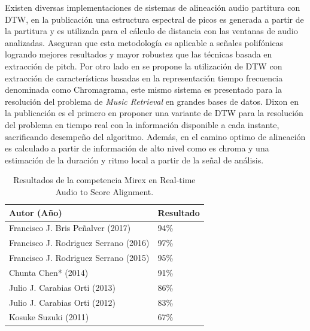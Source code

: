 \documentclass
  [ams,pdfout]%
	{aeslac}
\begin{document}
Existen diversas implementaciones de sistemas de alineación audio partitura con DTW, en la publicación \cite{orio2001alignment} una estructura espectral de picos es generada a partir de la partitura y es utilizada para el cálculo de distancia con las ventanas de audio analizadas. Aseguran que esta metodología es aplicable a señales polifónicas logrando mejores resultados y mayor robustez que las técnicas basada en extracción de pitch. Por otro lado en \cite{dannenberg2006music} se propone la utilización de DTW con extracción de características basadas en la representación tiempo frecuencia denominada como Chromagrama, este mismo sistema es presentado para la resolución del problema de \textit{Music Retrieval} en grandes bases de datos. Dixon en la publicación \cite{dixon2005live} es el primero en proponer una variante de DTW para la resolución del problema en tiempo real con la información disponible a cada instante, sacrificando desempeño del algoritmo. Además, en \cite{gagnon2007high} el camino optimo de alineación es calculado a partir de información de alto nivel como es chroma y una estimación de la duración y ritmo local a partir de la señal de análisis. 

\begin{table}[!ht]
\caption{Resultados de la competencia Mirex en Real-time  Audio to Score Alignment.}
\label{tab:Mirex}
\vspace*{10pt}
\centering
\small
\begin{tabular}{ll}
\textbf{Autor (Año)}	&	\textbf{Resultado}\\ \hline
Francisco J. Bris Peñalver (2017)     & 94\%   \\
Francisco J. Rodriguez Serrano (2016) & 97\%   \\
Francisco J. Rodriguez Serrano (2015) & 95\%   \\
Chunta Chen* (2014)                   & 91\%   \\
Julio J. Carabias Orti (2013)         & 86\%   \\
Julio J. Carabias Orti (2012)         & 83\%   \\
Kosuke Suzuki (2011)                  & 67\%   \\
\end{tabular}
\end{table}
\end{document}
